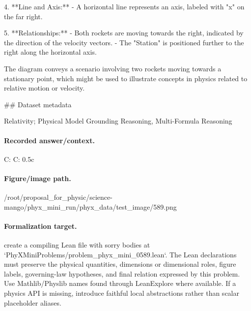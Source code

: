 4. **Line and Axis:**
   - A horizontal line represents an axis, labeled with "x" on the far right.

5. **Relationships:**
   - Both rockets are moving towards the right, indicated by the direction of the velocity vectors.
   - The "Station" is positioned further to the right along the horizontal axis.

The diagram conveys a scenario involving two rockets moving towards a stationary point, which might be used to illustrate concepts in physics related to relative motion or velocity.

\#\# Dataset metadata

Relativity; Physical Model Grounding Reasoning, Multi-Formula Reasoning

\paragraph{Recorded answer/context.}
C: C: 0.5c

\paragraph{Figure/image path.}
/root/proposal\_for\_physic/science-mango/phyx\_mini\_run/phyx\_data/test\_image/589.png

\paragraph{Formalization target.}
create a compiling Lean file with sorry bodies at `PhyXMiniProblems/problem\_phyx\_mini\_0589.lean`. The Lean declarations must preserve the physical quantities, dimensions or dimensional roles, figure labels, governing-law hypotheses, and final relation expressed by this problem.
Use Mathlib/Physlib names found through LeanExplore where available. If a physics API is missing, introduce faithful local abstractions rather than scalar placeholder aliases.

